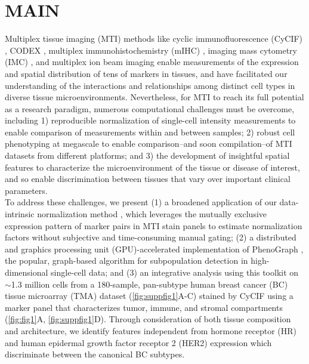 \documentclass[preprint,review,3p,12pt]{elsarticle}
\begin{document}
\linenumbers

\section{MAIN}
\label{S:1}
Multiplex tissue imaging (MTI) methods like cyclic  immunofluorescence (CyCIF) \cite{cycif2018, cmif2020}, CODEX \cite{codex2018}, multiplex immunohistochemistry (mIHC) \cite{mIHC2017}, imaging mass cytometry (IMC) \cite{imc2014}, and multiplex ion beam imaging \cite{mibi2014} enable measurements of the expression and spatial distribution of tens of markers in tissues, and have facilitated our understanding of the interactions and relationships among distinct cell types in diverse tissue microenvironments. Nevertheless, for MTI to reach its full potential as a research paradigm, numerous computational challenges must be overcome, including 1) reproducible normalization of single-cell intensity measurements to enable comparison of measurements within and between samples; 2) robust cell phenotyping at megascale to enable comparison--and soon compilation--of MTI datasets from different platforms; and 3) the development of insightful spatial features to characterize the microenvironment of the tissue or disease of interest, and so enable discrimination between tissues that vary over important clinical parameters.\\

To address these challenges, we present (1) a broadened application of our data-intrinsic normalization method \cite{Chang2020}, which leverages the mutually exclusive expression pattern of marker pairs in MTI stain panels to estimate normalization factors without subjective and time-consuming manual gating; (2) a distributed and graphics processing unit (GPU)-accelerated implementation of PhenoGraph \cite{Levine2015}, the popular, graph-based algorithm for subpopulation detection in high-dimensional single-cell data; and (3) an integrative analysis using this toolkit on $\sim$1.3 million cells from a 180-sample, pan-subtype human breast cancer (BC) tissue microarray (TMA) dataset (\autoref{fig:suppfig1}A-C) stained by CyCIF using a marker panel that characterizes tumor, immune, and stromal compartments (\autoref{fig:fig1}A, \autoref{fig:suppfig1}D). Through consideration of both tissue composition and architecture, we identify features independent from hormone receptor (HR) and human epidermal growth factor receptor 2 (HER2) expression which discriminate between the canonical BC subtypes.\\
\end{document}

